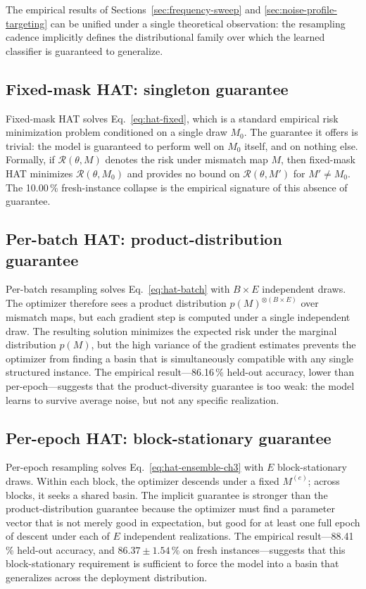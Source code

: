 The empirical results of Sections~\ref{sec:frequency-sweep} and \ref{sec:noise-profile-targeting} can be unified under a single theoretical observation: the resampling cadence implicitly defines the distributional family over which the learned classifier is guaranteed to generalize.

\subsection{Fixed-mask HAT: singleton guarantee}

Fixed-mask HAT solves Eq.~\ref{eq:hat-fixed}, which is a standard empirical risk minimization problem conditioned on a single draw $M_{0}$. The guarantee it offers is trivial: the model is guaranteed to perform well on $M_{0}$ itself, and on nothing else. Formally, if $\mathcal{R}(\theta,M)$ denotes the risk under mismatch map $M$, then fixed-mask HAT minimizes $\mathcal{R}(\theta,M_{0})$ and provides no bound on $\mathcal{R}(\theta,M')$ for $M'\neq M_{0}$. The 10.00\,\% fresh-instance collapse is the empirical signature of this absence of guarantee.

\subsection{Per-batch HAT: product-distribution guarantee}

Per-batch resampling solves Eq.~\ref{eq:hat-batch} with $B\times E$ independent draws. The optimizer therefore sees a product distribution $p(M)^{\otimes(B\times E)}$ over mismatch maps, but each gradient step is computed under a single independent draw. The resulting solution minimizes the expected risk under the marginal distribution $p(M)$, but the high variance of the gradient estimates prevents the optimizer from finding a basin that is simultaneously compatible with any single structured instance. The empirical result---86.16\,\% held-out accuracy, lower than per-epoch---suggests that the product-diversity guarantee is too weak: the model learns to survive average noise, but not any specific realization.

\subsection{Per-epoch HAT: block-stationary guarantee}

Per-epoch resampling solves Eq.~\ref{eq:hat-ensemble-ch3} with $E$ block-stationary draws. Within each block, the optimizer descends under a fixed $M^{(e)}$; across blocks, it seeks a shared basin. The implicit guarantee is stronger than the product-distribution guarantee because the optimizer must find a parameter vector that is not merely good in expectation, but good for at least one full epoch of descent under each of $E$ independent realizations. The empirical result---88.41\,\% held-out accuracy, and $86.37\pm1.54\,\%$ on fresh instances---suggests that this block-stationary requirement is sufficient to force the model into a basin that generalizes across the deployment distribution.

